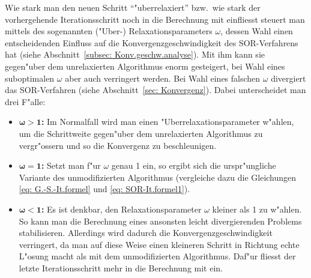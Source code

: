 \begin{refsection}
Wie stark man den neuen Schritt ``"uberrelaxiert'' bzw.~wie stark der
vorhergehende Iterationsschritt noch in die Berechnung mit einfliesst
steuert man mittels des sogenannten ("Uber-) Relaxationsparameters
$\omega$, dessen Wahl einen entscheidenden Einfluss auf die
Konvergenzgeschwindigkeit
des SOR-Verfahrens hat (siehe Abschnitt~\ref{subsec: Konv.geschw.analyse}).
Mit ihm kann sie gegen"uber dem unrelaxierten Algorithmus enorm gesteigert,
bei Wahl eines suboptimalen $\omega$ aber auch verringert werden. Bei Wahl
eines falschen $\omega$ divergiert das SOR-Verfahren (siehe
Abschnitt~\ref{sec: Konvergenz}).
Dabei unterscheidet man drei F"alle:
\begin{itemize}
\item $\boldsymbol{\omega > 1}$\textbf{:} Im Normalfall wird man einen
"Uberrelaxationsparameter w"ahlen, um die Schrittweite gegen"uber dem
unrelaxierten Algorithmus zu vergr"ossern und so die Konvergenz zu
beschleunigen.
\item $\boldsymbol{\omega = 1}$\textbf{:} Setzt man f"ur $\omega$ genau 1 ein,
so ergibt sich die urspr"ungliche Variante des unmodifizierten Algorithmus
(vergleiche dazu die Gleichungen \ref{eq: G.-S.-It.formel} und \ref{eq:
SOR-It.formel1}).
\item $\boldsymbol{\omega < 1}$\textbf{:} Es ist denkbar, den
Relaxationsparameter $\omega$
kleiner als 1 zu w"ahlen. So kann man die Berechnung eines ansonsten leicht
divergierenden
Problems stabilisieren. Allerdings wird dadurch die
Konvergenzgeschwindigkeit verringert,
da man auf diese Weise einen kleineren Schritt in Richtung echte L"osung
macht als mit dem
unmodifizierten Algorithmus.
Daf"ur fliesst der letzte Iterationsschritt mehr in die Berechnung mit ein.
\end{itemize}


\end{refsection}
